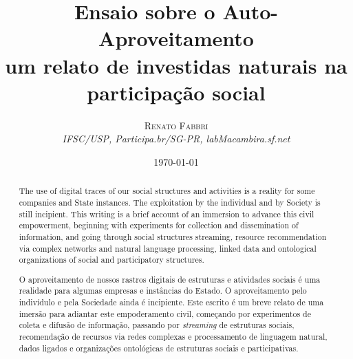 \documentclass[a4paper, 11pt]{article} %
\title{\textbf{Ensaio sobre o Auto-Aproveitamento}\\ %
um relato de investidas naturais na participação social} %
\author{\textsc{Renato Fabbri} %
\\{\textit{IFSC/USP, Participa.br/SG-PR, labMacambira.sf.net}}} %
\date{\today} %
\makeatletter
\renewcommand{\maketitle}{ %
\begin{flushright} %
{\LARGE\@title} %

\vspace{50pt} %

{\large\@author} %
\\\@date %

\vspace{40pt} %
\end{flushright}
}
\makeatother
\begin{document}
\maketitle %




{
\begin{abstract}
The use of digital traces of our social structures and activities is a reality for some companies and State instances. The exploitation by the individual and by Society is still incipient. This writing is a brief account of an immersion to advance this civil empowerment, beginning with experiments for collection and dissemination of information, and going through social structures streaming, resource recommendation via complex networks and natural language processing, linked data and ontological organizations of social and participatory structures.
\end{abstract}
}




\begin{abstract}
O aproveitamento de nossos rastros digitais de estruturas e atividades sociais é uma realidade para algumas empresas e instâncias do Estado. O aproveitamento pelo indivídulo e pela Sociedade ainda é incipiente. Este escrito é um breve relato de uma imersão para adiantar este empoderamento civil, começando por experimentos de coleta e difusão de informação, passando por \emph{streaming} de estruturas sociais, recomendação de recursos via redes complexas e processamento de linguagem natural, dados ligados e organizações ontológicas de estruturas sociais e participativas.
\end{abstract}
%
%
%
\end{document}
